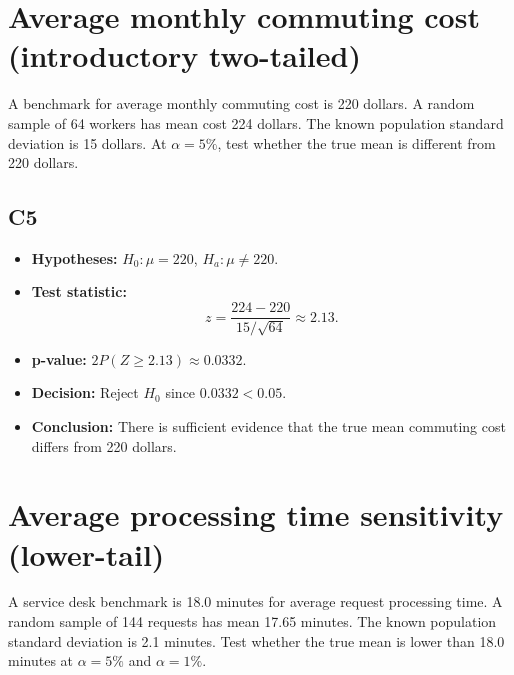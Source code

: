 \begin{center}
\end{center}


\section{Average monthly commuting cost (introductory two-tailed)}
A benchmark for average monthly commuting cost is 220 dollars. A random sample of 64 workers has mean cost 224 dollars. The known population standard deviation is 15 dollars. At \(\alpha=5\%\), test whether the true mean is different from 220 dollars.

\subsection*{C5}
\begin{itemize}
    \item \textbf{Hypotheses:} \(H_0\colon \mu=220\), \(H_a\colon \mu\ne220\).
    \item \textbf{Test statistic:}
    \[
    z=\frac{224-220}{15/\sqrt{64}}\approx 2.13.
    \]
    \item \textbf{p-value:} \(2P(Z\ge 2.13)\approx 0.0332\).
    \item \textbf{Decision:} Reject \(H_0\) since \(0.0332<0.05\).
    \item \textbf{Conclusion:} There is sufficient evidence that the true mean commuting cost differs from 220 dollars.
\end{itemize}

\begin{center}
\end{center}


\section{Average processing time sensitivity (lower-tail)}
A service desk benchmark is 18.0 minutes for average request processing time. A random sample of 144 requests has mean 17.65 minutes. The known population standard deviation is 2.1 minutes. Test whether the true mean is lower than 18.0 minutes at \(\alpha=5\%\) and \(\alpha=1\%\).

